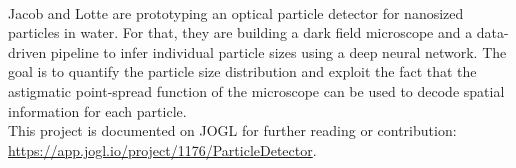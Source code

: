 \documentclass{report}
\begin{document}
 \\

Jacob and Lotte are prototyping an optical particle detector for nanosized particles in water. For that, they are building a dark field microscope and a data-driven pipeline to infer individual particle sizes using a deep neural network. The goal is to quantify the particle size distribution and exploit the fact that the astigmatic point-spread function of the microscope can be used to decode spatial information for each particle. \\

This project is documented on JOGL for further reading or contribution:
\url{https://app.jogl.io/project/1176/ParticleDetector}.

\clearpage
\begin{figure}
    \centering
\end{figure}
\clearpage

 \\
\end{document}
